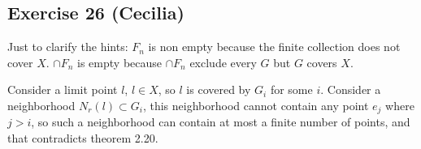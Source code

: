 \subsection*{Exercise 26 (Cecilia)}
Just to clarify the hints:
$ F_n $ is non empty because the finite collection does not cover $ X $.
$ \cap F_n $ is empty because $ \cap F_n $ exclude every $ G $ but $ G $ covers $ X $.

Consider a limit point $ l $, $ l \in X $, so $ l $ is covered by $ G_i $ for some $ i $. Consider a neighborhood $ N_r(l) \subset G_i $, this neighborhood cannot contain any point $ e_j $ where $ j > i $, so such a neighborhood can contain at most a finite number of points, and that contradicts theorem 2.20.
